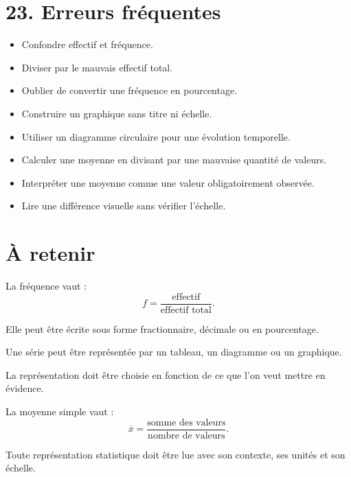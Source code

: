 \section{23. Erreurs fréquentes}

\begin{itemize}
\item Confondre effectif et fréquence.
\item Diviser par le mauvais effectif total.
\item Oublier de convertir une fréquence en pourcentage.
\item Construire un graphique sans titre ni échelle.
\item Utiliser un diagramme circulaire pour une évolution temporelle.
\item Calculer une moyenne en divisant par une mauvaise quantité de valeurs.
\item Interpréter une moyenne comme une valeur obligatoirement observée.
\item Lire une différence visuelle sans vérifier l'échelle.
\end{itemize}

\section{À retenir}

\begin{aretenir}
La fréquence vaut :
\[
\boxed{
f=\dfrac{\text{effectif}}{\text{effectif total}}
}.
\]

Elle peut être écrite sous forme fractionnaire, décimale ou en pourcentage.

Une série peut être représentée par un tableau, un diagramme ou un graphique.

La représentation doit être choisie en fonction de ce que l'on veut mettre en évidence.

La moyenne simple vaut :
\[
\boxed{
\overline{x}
=
\dfrac{\text{somme des valeurs}}{\text{nombre de valeurs}}
}.
\]

Toute représentation statistique doit être lue avec son contexte, ses unités et son échelle.
\end{aretenir}
